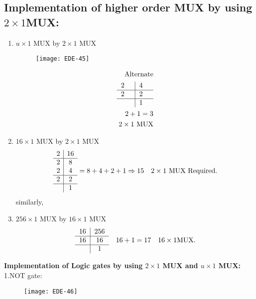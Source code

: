 \subsection{Implementation of higher order MUX by using $2\times 1$MUX:}
\begin{enumerate}
	\item $u\times1$ MUX by $2\times 1$ MUX\\
	\begin{figure}[H]
		\centering
		\texttt{[image: EDE-45]}
	\end{figure}
\begin{align*}
\text{Alternate}\\
\begin{tabular}{p{0.5cm}|p{0.5cm}}
2&4\\\hline
2&2\\\hline
&1
\end{tabular}\\
2+ 1=3\\
2 \times 1\text{ MUX}
\end{align*}
\item $16\times 1$ MUX by $2\times 1$ MUX
\begin{align*}
\begin{array}{c|c}
2 & 16 \\
\hline 2 & 8 \\
2 & 4 \\
\hline 2 & 2 \\
\hline & 1
\end{array}=8+4+2+1\Rightarrow 15 \quad 2 \times 1\text{ MUX
Required.}
\end{align*}
similarly,
\item $256 \times 1$ MUX by $16 \times 1$ MUX
\begin{align*}
\begin{tabular}{c|c}
16 & 256 \\
\hline 16 & 16\\
\hline  &1
\end{tabular}\quad 16+1=17 \quad 16 \times 1 \text{MUX} .
\end{align*}
\end{enumerate}
\textbf{Implementation of Logic gates by using $2 \times 1$ MUX and $u \times 1$ MUX:}\\
1.\quad NOT gate:
\begin{figure}[H]
	\centering
	\texttt{[image: EDE-46]}
\end{figure}
\renewcommand*{\arraystretch}{1.5}
